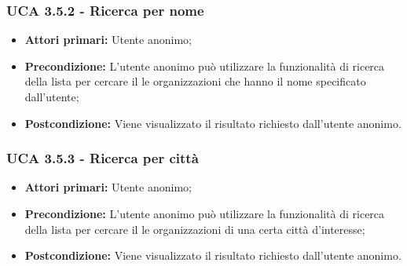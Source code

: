 \subsubsection{UCA 3.5.2 - Ricerca per nome}%
\begin{itemize}
	\item \textbf{Attori primari:} Utente anonimo;
	\item \textbf{Precondizione:} L’utente anonimo può utilizzare la funzionalità di ricerca della lista per cercare il le organizzazioni che hanno il nome specificato dall’utente;
	\item \textbf{Postcondizione:} Viene visualizzato il risultato richiesto dall’utente anonimo.
\end{itemize}

\subsubsection{UCA 3.5.3 - Ricerca per città}%
\begin{itemize}
	\item \textbf{Attori primari:} Utente anonimo;
	\item \textbf{Precondizione:} L'utente anonimo può utilizzare la funzionalità di ricerca della lista per cercare il le organizzazioni di una certa città d’interesse;
	\item \textbf{Postcondizione:} Viene visualizzato il risultato richiesto dall’utente anonimo.
\end{itemize}

